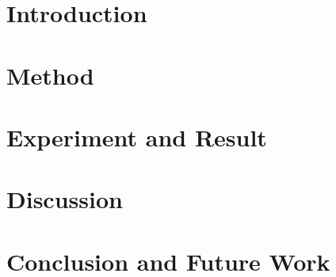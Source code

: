 
\chapter{Introduction} \label{ch:introduction}
	

\chapter{Method} \label{ch:method}
	

\chapter{Experiment and Result} \label{ch:experiment_and_result}
	

\chapter{Discussion} \label{ch:discussion}
	

\chapter{Conclusion and Future Work} \label{ch:conclusion}
	